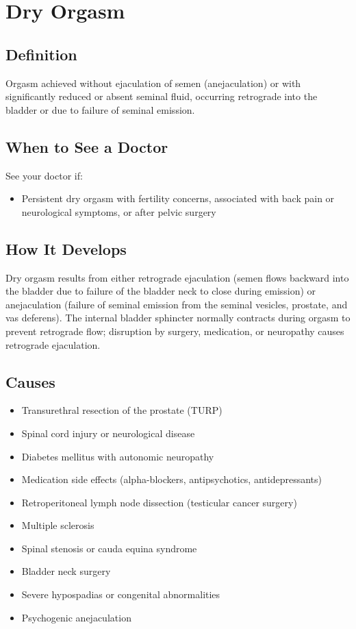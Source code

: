 \chapter{Dry Orgasm}

\section*{Definition}
Orgasm achieved without ejaculation of semen (anejaculation) or with significantly reduced or absent seminal fluid, occurring retrograde into the bladder or due to failure of seminal emission.

\section*{When to See a Doctor}
See your doctor if:
\begin{itemize}
  \item Persistent dry orgasm with fertility concerns, associated with back pain or neurological symptoms, or after pelvic surgery
\end{itemize}

\section*{How It Develops}
Dry orgasm results from either retrograde ejaculation (semen flows backward into the bladder due to failure of the bladder neck to close during emission) or anejaculation (failure of seminal emission from the seminal vesicles, prostate, and vas deferens). The internal bladder sphincter normally contracts during orgasm to prevent retrograde flow; disruption by surgery, medication, or neuropathy causes retrograde ejaculation.

\section*{Causes}
\begin{itemize}
  \item Transurethral resection of the prostate (TURP)
  \item Spinal cord injury or neurological disease
  \item Diabetes mellitus with autonomic neuropathy
  \item Medication side effects (alpha-blockers, antipsychotics, antidepressants)
  \item Retroperitoneal lymph node dissection (testicular cancer surgery)
  \item Multiple sclerosis
  \item Spinal stenosis or cauda equina syndrome
  \item Bladder neck surgery
  \item Severe hypospadias or congenital abnormalities
  \item Psychogenic anejaculation
\end{itemize}

